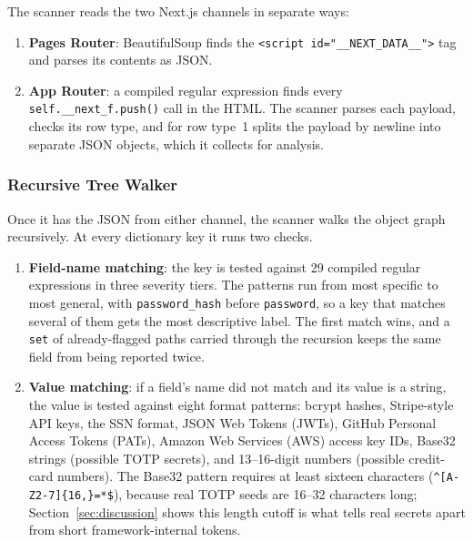 \documentclass[runningheads]{llncs}
\begin{document}
The scanner reads the two Next.js channels in separate ways:

\begin{enumerate}
  \item \textbf{Pages Router}: BeautifulSoup finds the
        \texttt{<script id="\_\_NEXT\_DATA\_\_">} tag and parses its
        contents as JSON.

  \item \textbf{App Router}: a compiled regular expression finds every
        \texttt{self.\_\_next\_f.push()} call in the HTML.  The scanner
        parses each payload, checks its row type, and for row type~1
        splits the payload by newline into separate JSON objects, which it
        collects for analysis.
\end{enumerate}

\subsubsection{Recursive Tree Walker}

Once it has the JSON from either channel, the scanner walks the object
graph recursively.  At every dictionary key it runs two checks.

\begin{enumerate}
  \item \textbf{Field-name matching}: the key is tested against 29
        compiled regular expressions in three severity tiers.  The
        patterns run from most specific to most general, with
        \texttt{password\_hash} before \texttt{password}, so a key that
        matches several of them gets the most descriptive label.  The
        first match wins, and a \texttt{set} of already-flagged paths
        carried through the recursion keeps the same field from being
        reported twice.

  \item \textbf{Value matching}: if a field's name did not match and its
        value is a string, the value is tested against eight format
        patterns: bcrypt hashes, Stripe-style API keys, the SSN format,
        JSON Web Tokens (JWTs), GitHub Personal Access Tokens (PATs),
        Amazon Web Services (AWS) access key IDs, Base32 strings (possible
        TOTP secrets), and 13--16-digit numbers (possible credit-card
        numbers).  The Base32 pattern requires at least sixteen characters
        (\texttt{\^{}[A-Z2-7]\{16,\}=*\$}), because real TOTP seeds are
        16--32 characters long; Section~\ref{sec:discussion} shows this
        length cutoff is what tells real secrets apart from short
        framework-internal tokens.
\end{enumerate}
\end{document}
